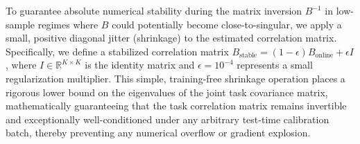 \begin{remark}
To guarantee absolute numerical stability during the matrix inversion $B^{-1}$
in low-sample regimes where $B$ could potentially become close-to-singular, we
apply a small, positive diagonal jitter (shrinkage) to the estimated correlation
matrix. Specifically, we define a stabilized correlation matrix
$B_{\text{stable}} = (1 - \epsilon) B_{\text{online}} + \epsilon I$, where $I
\in \mathbb{R}^{K \times K}$ is the identity matrix and $\epsilon = 10^{-4}$
represents a small regularization multiplier. This simple, training-free
shrinkage operation places a rigorous lower bound on the eigenvalues of the
joint task covariance matrix, mathematically guaranteeing that the task
correlation matrix remains invertible and exceptionally well-conditioned under
any arbitrary test-time calibration batch, thereby preventing any numerical
overflow or gradient explosion.
\end{remark}

